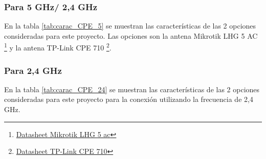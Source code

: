 \documentclass[11pt,a4paper]{article}
\begin{document}
\subsubsection{Para 5 GHz/ 2,4 GHz}

En la tabla \ref{tab:carac_CPE_5} se muestran las características de las 2 opciones consideradas para este proyecto.
Las opciones son la antena Mikrotik LHG 5 AC \footnote{\href{https://mikrotik.com/product/lhg_5_ac}{Datasheet Mikrotik LHG 5 ac}} y la antena TP-Link CPE 710 \footnote{\href{https://static.tp-link.com/2020/202003/20200324/CPE\%20series-Datasheet.pdf}{Datasheet TP-Link CPE 710}}.


\begin{table}[htbp]
    \caption{características de CPE para 5 GHz/ 2.4 GHz.}
  \label{tab:carac_CPE_5}%
\end{table}%


\subsubsection{Para 2,4 GHz}
En la tabla \ref{tab:carac_CPE_24} se muestran las características de las 2 opciones consideradas para este proyecto para la conexión utilizando la frecuencia de 2,4 GHz.
\end{document}
